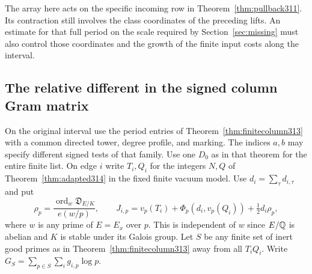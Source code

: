\documentclass[a4paper,11pt]{article}
\theoremstyle{definition}
\theoremstyle{remark}
\numberwithin{equation}{section}
\begin{document}
The array here acts on the specific incoming row in
Theorem~\ref{thm:pullback311}. Its contraction still involves the
class coordinates of the preceding lifts. An estimate for that
full period on the scale required by Section~\ref{sec:missing}
must also control those coordinates and the growth of the finite
input costs along the interval.

\subsection{The relative different in the signed column Gram matrix}\label{nav:IX-64}
On the original interval use the period entries of
Theorem~\ref{thm:finitecolumn313} with a common directed tower,
degree profile, and marking. The indices \(a,b\) may specify
different signed tests of that family. Use one \(D_0\) as in that
theorem for the entire finite list. On edge \(i\) write \(T_i,Q_i\)
for the integers \(N,Q\) of Theorem~\ref{thm:adapted314} in the
fixed finite vacuum model. Use \(d_i=\sum_\tau d_{i,\tau}\) and
put
\[
 \rho_p=\frac{\operatorname{ord}_{w}\mathfrak D_{E/K}}{e(w/p)},
 \qquad J_{i,p}=v_p(T_i)+\Phi_p(d_i,v_p(Q_i))
                              +\tfrac12d_i\rho_p ,
\]
where \(w\) is any prime of \(E=E_x\) over \(p\). This is
independent of \(w\) since \(E/\mathbb Q\) is abelian and \(K\)
is stable under its Galois group. Let \(S\) be any finite set
of inert good primes as in Theorem~\ref{thm:finitecolumn313}
away from all \(T_iQ_i\). Write \(G_S=\sum_{p\in S}
\sum_i g_{i,p}\log p\).
\end{document}
